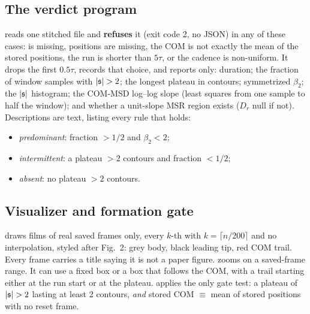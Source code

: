 \documentclass[11pt]{article}
\begin{document}
\subsection{The verdict program}\label{sec:verdict}
 reads one stitched file and \textbf{refuses} it (exit code 2, no JSON) in any of these cases:
 is missing, positions are missing, the COM is not exactly the mean of the stored positions, the run is shorter than $5\tau$,
or the cadence is non-uniform. It drops the first $0.5\tau$, records that choice, and reports only:
duration; the fraction of window samples with $|\spn|>2$; the longest plateau in contours; symmetrized $\beta_2$; the $|\mathfrak{s}|$ histogram;
the COM-MSD log--log slope (least squares from one sample to half the window); and whether a unit-slope MSR region exists ($D_r$ null if not).
Descriptions are text, listing every rule that holds:
\begin{itemize}
\item \emph{predominant}: fraction $>1/2$ and $\beta_2<2$;
\item \emph{intermittent}: a plateau $>2$ contours and fraction $<1/2$;
\item \emph{absent}: no plateau $>2$ contours.
\end{itemize}

\subsection{Visualizer and formation gate}
 draws films of real saved frames only, every $k$-th with $k=\lceil n/200\rceil$ and no interpolation, styled after Fig.~2:
grey body, black leading tip, red COM trail. Every frame carries a title saying it is not a paper figure.
 zooms on a saved-frame range. It can use a fixed box or a box that follows the COM, with a trail starting either at the run start or at the plateau.
 applies the only gate test: a plateau of $|\spn|>2$ lasting at least 2 contours, \emph{and} stored COM $\equiv$ mean of stored positions with no reset frame.


\end{document}
